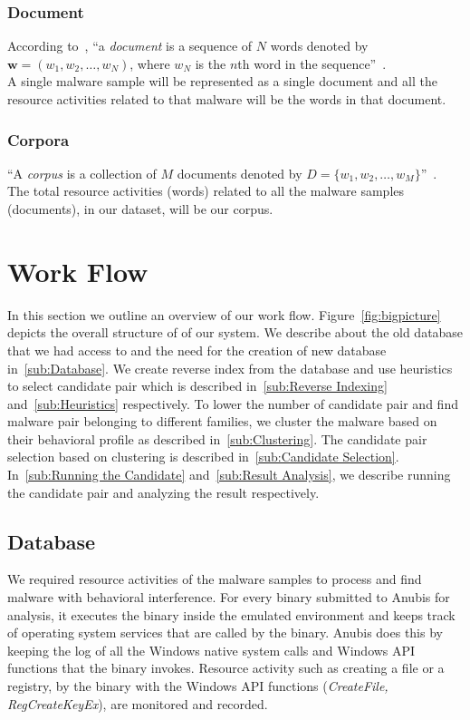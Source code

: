\subsubsection{Document}
According to~\citeauthor{Blei}, ``a \emph{document} is a sequence of $N$ words denoted by $\textbf{w} = (w_1,w_2,\ldots,w_N)$, where $w_N$ is the $n$th word in the sequence''~\cite[]{Blei}.\\
A single malware sample will be represented as a single document and all the resource activities related to that malware will be the words in that document.
\label{ssub:Document}
\subsubsection{Corpora}
\label{ssub:Corpora}
``A \emph{corpus} is a collection of $M$ documents denoted by $D = \{w_1,w_2,\ldots,w_M\}$''~\cite[]{Blei}.\\
The total resource activities (words) related to all the malware samples (documents), in our dataset, will be our corpus.\\

\section{Work Flow}
\label{sec:Work Flow}
In this section we outline an overview of our work flow.
Figure~\ref{fig:bigpicture} depicts the overall structure of of our system.
We describe about the old database that we had access to and the need for the creation of new database in~\autoref{sub:Database}.
We create reverse index from the database and use heuristics to select candidate pair which is described in~\autoref{sub:Reverse Indexing} and~\autoref{sub:Heuristics} respectively.
To lower the number of candidate pair and find malware pair belonging to different families, we cluster the malware based on their behavioral profile as described in~\autoref{sub:Clustering}.
The candidate pair selection based on clustering is described in~\autoref{sub:Candidate Selection}.
In~\autoref{sub:Running the Candidate} and~\autoref{sub:Result Analysis}, we describe running the candidate pair and analyzing the result respectively.
\subsection{Database}
\label{sub:Database}
We required resource activities of the malware samples to process and find malware with behavioral interference.
For every binary submitted to Anubis for analysis, it executes the binary inside the emulated environment and keeps track of operating system services that are called by the binary.
Anubis does this by keeping the log of all the Windows native system calls and Windows API functions that the binary invokes.
Resource activity such as creating a file or a registry, by the binary with the Windows API functions (\emph{CreateFile, RegCreateKeyEx}), are monitored and recorded.

